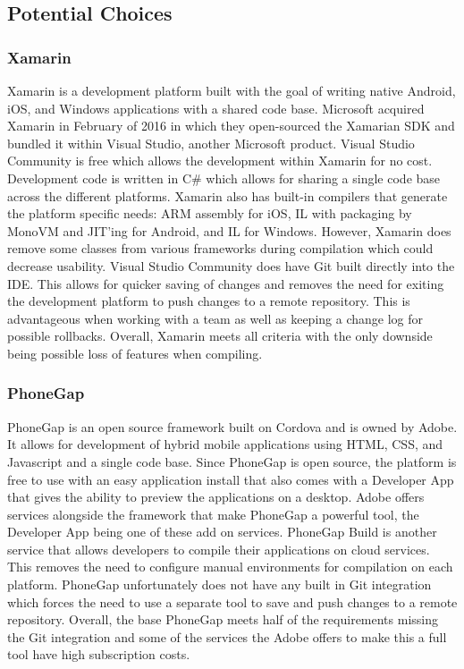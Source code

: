 \documentclass[onecolumn, draftclsnofoot,10pt, compsoc]{IEEEtran}
\begin{document}
\begin{singlespace}
\subsection{Potential Choices}
\subsubsection{Xamarin}

Xamarin is a development platform built with the goal of writing native Android, iOS, and Windows applications with a shared code base. Microsoft acquired Xamarin 
in February of 2016 in which they open-sourced the Xamarian SDK and bundled it within Visual Studio, another Microsoft product. Visual Studio Community is free
which allows the development within Xamarin for no cost. Development code is written in C\# which allows for sharing a single code base across the different platforms.
Xamarin also has built-in compilers that generate the platform specific needs: ARM assembly for iOS, IL with packaging by MonoVM and JIT'ing for Android, and IL for Windows.
However, Xamarin does remove some classes from various frameworks during compilation which could decrease usability. Visual Studio Community does have Git built directly into the IDE.
This allows for quicker saving of changes and removes the need for exiting the development platform to push changes to a remote repository. This is advantageous when working with
a team as well as keeping a change log for possible rollbacks. Overall, Xamarin meets all criteria with the only downside being possible loss of features when compiling.

\subsubsection{PhoneGap}

PhoneGap is an open source framework built on Cordova and is owned by Adobe. It allows for development of hybrid mobile applications using HTML, CSS, and Javascript and a single code base.
Since PhoneGap is open source, the platform is free to use with an easy application install that also comes with a Developer App that gives the ability to preview the applications on a desktop.
Adobe offers services alongside the framework that make PhoneGap a powerful tool, the Developer App being one of these add on services. PhoneGap Build is another service that allows developers to
compile their applications on cloud services. This removes the need to configure manual environments for compilation on each platform. PhoneGap unfortunately does not have any built in Git integration
which forces the need to use a separate tool to save and push changes to a remote repository. Overall, the base PhoneGap meets half of the requirements missing the Git integration and some
of the services the Adobe offers to make this a full tool have high subscription costs.


\end{singlespace}
\end{document}
